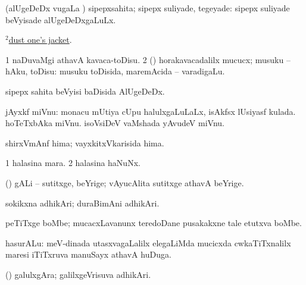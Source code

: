\noindent
\gl{\pagu}
\bmng
  (alUgeDeDx \mo vugaLa \vi) sipepxsahita; sipepx suliyade, tegeyade:  sipepx suliyade beVyisade alUgeDeDxgaLuLx. 
\emng

\noindent
\gl{\nuga}
\bmng
\hyperref{kandict_d.pdf}{D}{dust(2) nuga(1)}{$^2$dust one's jacket}. 
\emng
\eentry

\bentry
{}
\gl{\sakirx}
\bmng
\bnum
\num{1} naDuvaMgi athavA kavaca-toDisu. 
\num{2} (\rUpa) horakavacadalilx mucucx; musuku -- hAku, toDisu:  musuku toDisida, maremAcida -- varadigaLu. 
\enum
\emng
\eentry

\bentry
{}
\gl{\nA}
\bmng
sipepx sahita beVyisi baDisida AlUgeDeDx. 
\emng
\eentry

\bentry
{}
\gl{\nA}
\bmng
jAyxkf miVnu: 
\banum
{} monacu mUtiya cUpu halulxgaLuLaLx, isAkfsx lUsiyasf kulada. hoTeTxbAka miVnu. 
 isoVsiDeV vaMshada yAvudeV miVnu. 
\eanum
\emng
\eentry

\bentry
{}
\gl{\nA}
\bmng
shirxVmAnf hima; vayxkitxVkarisida hima. 
\emng
\eentry

\bentry
{}
\gl{\nA}
\bmng
\bnum
\num{1} halasina mara. 
\num{2} halasina haNuNx. 
\enum
\emng
\eentry

\bentry
{}
\gl{\nA}
\bmng
(\ame) gALi -- sutitxge, beYrige; vAyucAlita sutitxge athavA beYrige. 
\emng
\eentry

\bentry
{}
\gl{\nA}
\bmng
sokikxna adhikAri; duraBimAni adhikAri. 
\emng
\eentry

\bentry
{}
\gl{\nA}
\bmng
peTiTxge boMbe; mucacxLavanunx teredoDane pusakakxne tale etutxva boMbe.   
\emng
\eentry

\bentry
{}
\gl{\nA}
\bmng
hasurALu: meV-dinada utasxvagaLalilx elegaLiMda mucicxda cwkaTiTxnalilx maresi iTiTxruva manuSayx athavA huDuga. 
\emng
\eentry

\bentry
{}
\gl{\nA}
\bmng
(\birx) galulxgAra; galilxgeVrisuva adhikAri. 
\emng
\eentry

